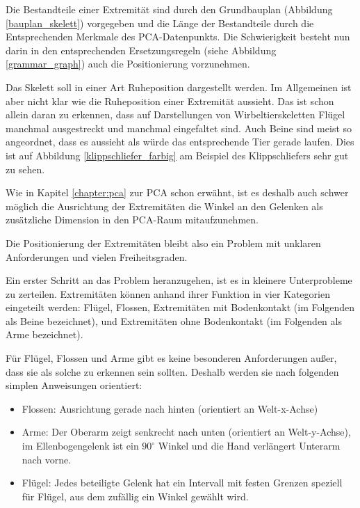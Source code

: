 Die Bestandteile einer Extremität sind durch den Grundbauplan (Abbildung \ref{bauplan_skelett}) vorgegeben und die Länge der Bestandteile durch die Entsprechenden Merkmale des PCA-Datenpunkts. Die Schwierigkeit besteht nun darin in den entsprechenden Ersetzungsregeln (siehe Abbildung \ref{grammar_graph}) auch die Positionierung vorzunehmen.

Das Skelett soll in einer Art Ruheposition dargestellt werden. Im Allgemeinen ist aber nicht klar wie die Ruheposition einer Extremität aussieht. Das ist schon allein daran zu erkennen, dass auf Darstellungen von Wirbeltierskeletten Flügel manchmal ausgestreckt und manchmal eingefaltet sind. Auch Beine sind meist so angeordnet, dass es aussieht als würde das entsprechende Tier gerade laufen. Dies ist auf Abbildung \ref{klippschliefer_farbig} am Beispiel des Klippschliefers sehr gut zu sehen.

Wie in Kapitel \ref{chapter:pca} zur PCA schon erwähnt, ist es deshalb auch schwer möglich die Ausrichtung der Extremitäten \bzw die Winkel an den Gelenken als zusätzliche Dimension in den PCA-Raum mitaufzunehmen.

Die Positionierung der Extremitäten bleibt also ein Problem mit unklaren Anforderungen und vielen Freiheitsgraden.

Ein erster Schritt an das Problem heranzugehen, ist es in kleinere Unterprobleme zu zerteilen.
Extremitäten können anhand ihrer Funktion in vier Kategorien eingeteilt werden:
Flügel, Flossen, Extremitäten mit Bodenkontakt (im Folgenden als Beine bezeichnet), und Extremitäten ohne Bodenkontakt (im Folgenden als Arme bezeichnet).

Für Flügel, Flossen und Arme gibt es keine besonderen Anforderungen außer, dass sie als solche zu erkennen sein sollten. Deshalb werden sie nach folgenden simplen Anweisungen orientiert:
\begin{itemize}
 \item Flossen: Ausrichtung gerade nach hinten (orientiert an Welt-x-Achse)
 \item Arme: Der Oberarm zeigt senkrecht nach unten (orientiert an Welt-y-Achse), im Ellenbogengelenk ist ein $90^{\circ}$ Winkel und die Hand verlängert Unterarm nach vorne.
 \item Flügel: Jedes beteiligte Gelenk hat ein Intervall mit festen Grenzen speziell für Flügel, aus dem zufällig ein Winkel gewählt wird.
\end{itemize}

